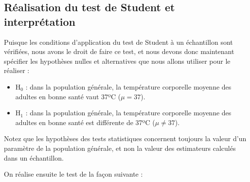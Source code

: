 \documentclass[
  a4paper,
  DIV=11,
  numbers=noendperiod,
  oneside]{scrreprt}
\newenvironment{Shaded}{}{}
\newcommand{\AttributeTok}[1]{\textcolor[rgb]{0.84,0.23,0.29}{#1}}
\newcommand{\DecValTok}[1]{\textcolor[rgb]{0.00,0.36,0.77}{#1}}
\newcommand{\FunctionTok}[1]{\textcolor[rgb]{0.44,0.26,0.76}{#1}}
\newcommand{\NormalTok}[1]{\textcolor[rgb]{0.14,0.16,0.18}{#1}}
\newcommand{\SpecialCharTok}[1]{\textcolor[rgb]{0.00,0.36,0.77}{#1}}
\providecommand{\tightlist}{%
  \setlength{\itemsep}{0pt}\setlength{\parskip}{0pt}}\usepackage{longtable,booktabs,array}
\begin{document}
\hypertarget{ruxe9alisation-du-test-de-student-et-interpruxe9tation}{%
\subsection{Réalisation du test de Student et
interprétation}\label{ruxe9alisation-du-test-de-student-et-interpruxe9tation}}

Puisque les conditions d'application du test de Student à un échantillon
sont vérifiées, nous avons le droit de faire ce test, et nous devons
donc maintenant spécifier les hypothèses nulles et alternatives que nous
allons utiliser pour le réaliser :

\begin{itemize}
\tightlist
\item
  H\(_0\) : dans la population générale, la température corporelle
  moyenne des adultes en bonne santé vaut 37ºC (\(\mu = 37\)).
\item
  H\(_1\) : dans la population générale, la température corporelle
  moyenne des adultes en bonne santé est différente de 37ºC
  (\(\mu \neq 37\)).
\end{itemize}

\begin{tcolorbox}[enhanced jigsaw, breakable, toprule=.15mm, colbacktitle=quarto-callout-warning-color!10!white, colframe=quarto-callout-warning-color-frame, arc=.35mm, bottomtitle=1mm, opacityback=0, title=\textcolor{quarto-callout-warning-color}{\faExclamationTriangle}\hspace{0.5em}{Hypothèses et paramètres}, bottomrule=.15mm, colback=white, toptitle=1mm, rightrule=.15mm, leftrule=.75mm, opacitybacktitle=0.6, left=2mm, titlerule=0mm, coltitle=black]

Notez que les hypothèses des tests statistiques concernent toujours la
valeur d'un paramètre de la population générale, et non la valeur des
estimateurs calculés dans un échantillon.

\end{tcolorbox}

On réalise ensuite le test de la façon suivante :

\begin{Shaded}
\end{Shaded}
\end{document}
